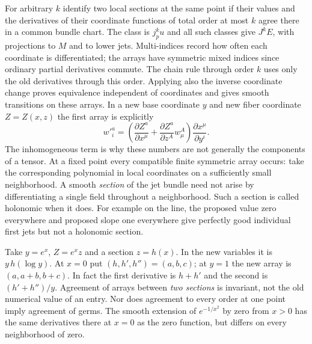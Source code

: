 For arbitrary $k$ identify two local sections at the same point if their values and the derivatives of their coordinate functions of total order at most $k$ agree there in a common bundle chart. The class is $j^k_p u$ and all such classes give $J^kE$, with projections to $M$ and to lower jets. Multi-indices record how often each coordinate is differentiated; the arrays have symmetric mixed indices since ordinary partial derivatives commute. The chain rule through order $k$ uses only the old derivatives through this order. Applying also the inverse coordinate change proves equivalence independent of coordinates and gives smooth transitions on these arrays. In a new base coordinate $y$ and new fiber coordinate $Z=Z(x,z)$ the first array is explicitly
\[
 w'^a_i=\left(\frac{\partial Z^a}{\partial x^\mu}+\frac{\partial Z^a}{\partial z^A}w^A_\mu\right)\frac{\partial x^\mu}{\partial y^i} .
\]
The inhomogeneous term is why these numbers are not generally the components of a tensor. At a fixed point every compatible finite symmetric array occurs: take the corresponding polynomial in local coordinates on a sufficiently small neighborhood. A smooth \emph{section} of the jet bundle need not arise by differentiating a single field throughout a neighborhood. Such a section is called holonomic when it does. For example on the line, the proposed value zero everywhere and proposed slope one everywhere give perfectly good individual first jets but not a holonomic section.

\begin{example}Take $y=e^x$, $Z=e^x z$ and a section $z=h(x)$. In the new variables it is $y\,h(\log y)$. At $x=0$ put $(h,h',h'')=(a,b,c)$; at $y=1$ the new array is $(a,a+b,b+c)$. In fact the first derivative is $h+h'$ and the second is $(h'+h'')/y$. Agreement of arrays between \emph{two sections} is invariant, not the old numerical value of an entry. Nor does agreement to every order at one point imply agreement of germs. The smooth extension of $e^{-1/x^2}$ by zero from $x>0$ has the same derivatives there at $x=0$ as the zero function, but differs on every neighborhood of zero.\end{example}

